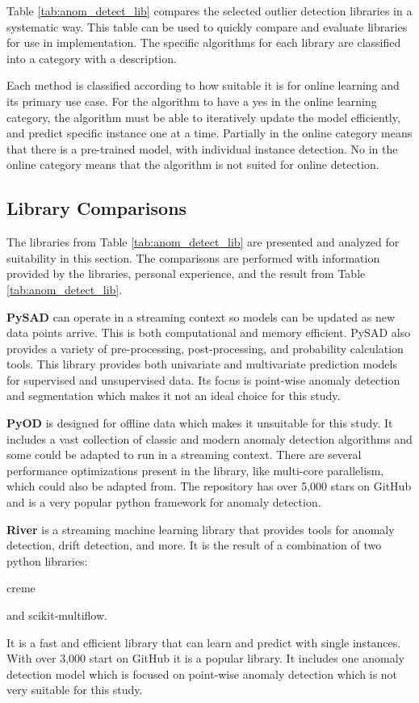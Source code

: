 Table \ref{tab:anom_detect_lib} compares the selected outlier detection libraries in a systematic way. This table can be used to quickly compare and evaluate libraries for use in implementation. The specific algorithms for each library are classified into a category with a description.
 
Each method is classified according to how suitable it is for online learning and its primary use case. For the algorithm to have a yes in the online learning category, the algorithm must be able to iteratively update the model efficiently, and predict specific instance one at a time. Partially in the online category means that there is a pre-trained model, with individual instance detection. No in the online category means that the algorithm is not suited for online detection. 




\subsection{Library Comparisons}

The libraries from Table \ref{tab:anom_detect_lib} are presented and analyzed for suitability in this section. The comparisons are performed with information provided by the libraries, personal experience, and the result from Table \ref{tab:anom_detect_lib}.

\textbf{PySAD} \parencite{pysad} can operate in a streaming context so models can be updated as new data points arrive. This is both computational and memory efficient. PySAD also provides a variety of pre-processing, post-processing, and probability calculation tools. This library provides both univariate and multivariate prediction models for supervised and unsupervised data. Its focus is point-wise anomaly detection and segmentation which makes it not an ideal choice for this study.


\textbf{PyOD} \parencite{zhao2019pyod} is designed for offline data which makes it unsuitable for this study. It includes a vast collection of classic and modern anomaly detection algorithms and some could be adapted to run in a streaming context. There are several performance optimizations present in the library, like multi-core parallelism, which could also be adapted from. The repository has over 5,000 stars on GitHub and is a very popular python framework for anomaly detection.

\textbf{River} \parencite{2020river} is a streaming machine learning library that provides tools for anomaly detection, drift detection, and more. It is the result of a combination of two python libraries: 
\begin{inlinelist}
    \item creme
    \item and scikit-multiflow.
\end{inlinelist} It is a fast and efficient library that can learn and predict with single instances. With over 3,000 start on GitHub it is a popular library. It includes one anomaly detection model which is focused on point-wise anomaly detection which is not very suitable for this study.

